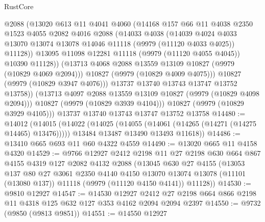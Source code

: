 \begin{lexlean}{RustCore}
\begin{coremodule}
                @2088
                (@13020
                  @613
                  @11
                  @4041
                  @4060
                  (@14168
                    @157
                    @66
                    @11
                    @4038
                    @2350
                    @1523
                    @4055
                    @2082
                    @4016
                    @2088
                    (@14033
                      @4038
                      (@14039
                        @4024
                        @4033
                        @13070
                        @13074
                        @13078
                        @14046
                        @11118
                        (@9979 (@11120 @4033 @4025))
                        @11128))
                    @13095
                    @11098
                    @12281
                    @11118
                    (@9979 (@11120 @4055 @4045))
                    @10390
                    @11128))
                (@13713 @4068 @2088 @13559 @13109 @10827 (@9979 (@10829 @4069 @2094)))
                @10827
                (@9979 (@10829 @4009 @4075)))
              @10827
              (@9979 (@10829 @3947 @4076)))
            @13737
            @13740
            @13743
            @13747
            @13752
            @13758))
        (@13713 @4097 @2088 @13559 @13109 @10827 (@9979 (@10829 @4098 @2094)))
        @10827
        (@9979 (@10829 @3939 @4104)))
      @10827
      (@9979 (@10829 @3929 @4105)))
    @13737
    @13740
    @13743
    @13747
    @13752
    @13758
@14480 := @14012
    (@14015
      (@14022
        (@14025 (@14055 (@14061 (@14265 (@14271 (@14275 @14465) @13476)))))
        @13484
        @13487
        @13490
        @13493
        @11618))
@14486 := @13410 @665 @693 @11 @60 @4322 @4559
@14490 := @13020 @665 @11 @4158 @4320
@14529 := @9766
    @12927
    @2412
    @2198
    @11
    @27
    @2198
    @630
    @664
    @867
    @4155
    @4319
    @127
    @2082
    @4132
    @2088
    (@13045
      @630
      @27
      @4155
      (@13053
        @137
        @80
        @27
        @3061
        @2350
        @4140
        @4150
        @13070
        @13074
        @13078
        (@11101 (@13080 @137))
        @11118
        (@9979 (@11120 @4150 @4141))
        @11128))
@14530 := @9810 @12927
@14547 := @14530
    @12927
    @2412
    @27
    @2198
    @664
    @866
    @2198
    @11
    @4318
    @125
    @632
    @127
    @353
    @4162
    @2094
    @2094
    @2397
@14550 := @9732 (@9850 (@9813 @9851))
@14551 := @14550 @12927

\end{coremodule}
\end{lexlean}
